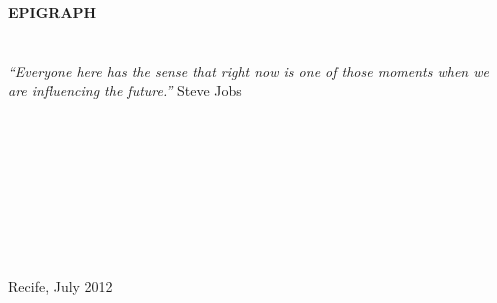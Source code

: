 \begin{flushbottom}
\textbf{EPIGRAPH}
\\
\\
\\
\textit{``Everyone here has the sense that right now is one of those moments when we are influencing the future.''} Steve Jobs
\\
\\
\\
\\
\\
\\
\\
\\
\\
\\Recife, July 2012
\end{flushbottom}
\newpage
